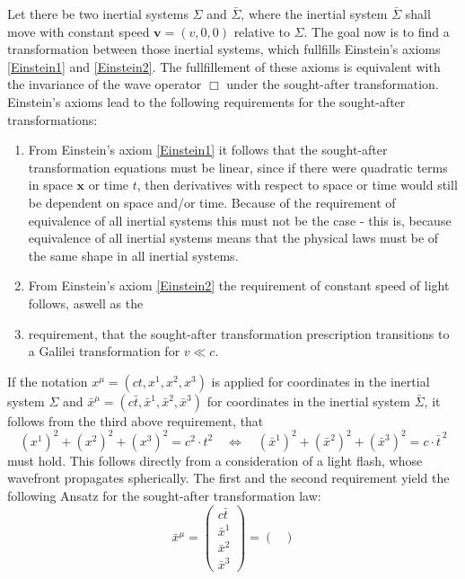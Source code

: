 \documentclass[a4paper,11pt]{article}
\numberwithin{equation}{section}
\newcommand\vect[1]{\ensuremath{\bm{#1}}}
\begin{document}
{Let there be two inertial systems $\Sigma$ and $\bar{\Sigma}$, where the inertial system $\bar{\Sigma}$ shall move with constant speed $\vect{v}=(v,0,0)$ relative to $\Sigma$. The goal now is to find a transformation between those inertial systems, which fullfills Einstein's axioms \ref{Einstein1} and \ref{Einstein2}. The fullfillement of these axioms is equivalent with the invariance of the wave operator $\Box$ under the sought-after transformation. Einstein's axioms lead to the following requirements for the sought-after transformations:
\begin{enumerate}
\item From Einstein's axiom \ref{Einstein1} it follows that the sought-after transformation equations must be linear, since if there were quadratic terms in space $\vect{x}$ or time $t$, then derivatives with respect to space or time would still be dependent on space and/or time. Because of the requirement of equivalence of all inertial systems this must not be the case - this is, because equivalence of all inertial systems means that the physical laws must be of the same shape in all inertial systems.
\item From Einstein's axiom \ref{Einstein2} the requirement of constant speed of light follows, aswell as the
\item requirement, that the sought-after transformation prescription transitions to a Galilei transformation for $v \ll c$.
\end{enumerate}
If the notation $x^\mu = (ct,x^1,x^2,x^3)$ is applied for coordinates in the inertial system $\Sigma$ and $\bar{x}^{\mu} = (c\bar{t},\bar{x}^{1},\bar{x}^{2},\bar{x}^{3})$ for coordinates in the inertial system $\bar{\Sigma}$, it follows from the third above requirement, that \begin{equation}\label{eq:bedlor1}
(x^1)^2+(x^2)^2+(x^3)^2 = c^2 \cdot t^2 \quad \Leftrightarrow \quad (\bar{x}^{1})^2+(\bar{x}^{2})^2+(\bar{x}^{3})^2 = c\cdot \bar{t}^{\,2}
\end{equation} must hold. This follows directly from a consideration of a light flash, whose wavefront propagates spherically. The first and the second requirement yield the following Ansatz for the sought-after transformation law:
\begin{equation}
\bar{x}^\mu = \begin{pmatrix}
c \bar{t} \, \\ \bar{x}^1 \\ \bar{x}^2 \\ \bar{x}^3
\end{pmatrix} = \begin{pmatrix}

\end{pmatrix}
\end{equation}}
\end{document}
